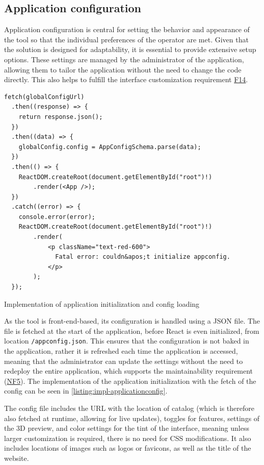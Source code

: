 \subsection{Application configuration}

Application configuration is central for setting the behavior and appearance of the tool so that the individual preferences of the operator are met. Given that the solution is designed for adaptability, it is essential to provide extensive setup options. These settings are managed by the administrator of the application, allowing them to tailor the application without the need to change the code directly. This also helps to fulfill the interface customization requirement \hyperref[itm:F14]{F14}.

\begin{listing}[h!]
\begin{verbatim}
fetch(globalConfigUrl)
  .then((response) => {
    return response.json();
  })
  .then((data) => {
    globalConfig.config = AppConfigSchema.parse(data);
  })
  .then(() => {
    ReactDOM.createRoot(document.getElementById("root")!)
        .render(<App />);
  })
  .catch((error) => {
    console.error(error);
    ReactDOM.createRoot(document.getElementById("root")!)
        .render(
            <p className="text-red-600">
              Fatal error: couldn&apos;t initialize appconfig.
            </p>
        );
  });
\end{verbatim}
\caption{Implementation of application initialization and config loading}
\label{listing:impl-applicationconfig}
\end{listing}

As the tool is front-end-based, its configuration is handled using a JSON file. The file is fetched at the start of the application, before React is even initialized, from location \texttt{/appconfig.json}. This ensures that the configuration is not baked in the application, rather it is refreshed each time the application is accessed, meaning that the administrator can update the settings without the need to redeploy the entire application, which supports the maintainability requirement (\hyperref[itm:NF5]{NF5}). The implementation of the application initialization with the fetch of the config can be seen in \autoref{listing:impl-applicationconfig}.

The config file includes the URL with the location of catalog (which is therefore also fetched at runtime, allowing for live updates), toggles for features, settings of the 3D preview, and color settings for the tint of the interface, meaning unless larger customization is required, there is no need for CSS modifications. It also includes locations of images such as logos or favicons, as well as the title of the website.

